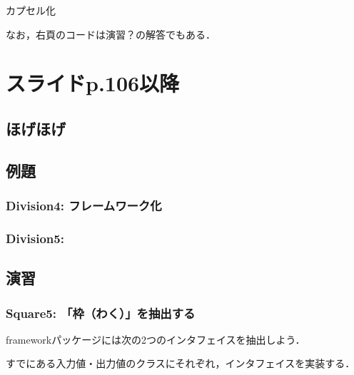 \documentclass[a4j,papersize]{jsbook}
\begin{document}
カプセル化




なお，右頁のコードは演習？の解答でもある．

\newpage

\newpage

\chapter{スライドp.106以降}
\section{ほげほげ}



\newpage
\section{例題}
\subsection{Division4: フレームワーク化}

\newpage

\newpage

\subsection{Division5: }
\newpage

\newpage


\newpage
\section{演習}
\subsection{Square5: 「枠（わく）」を抽出する}

frameworkパッケージには次の2つのインタフェイスを抽出しよう．




すでにある入力値・出力値のクラスにそれぞれ，インタフェイスを実装する．



\end{document}
